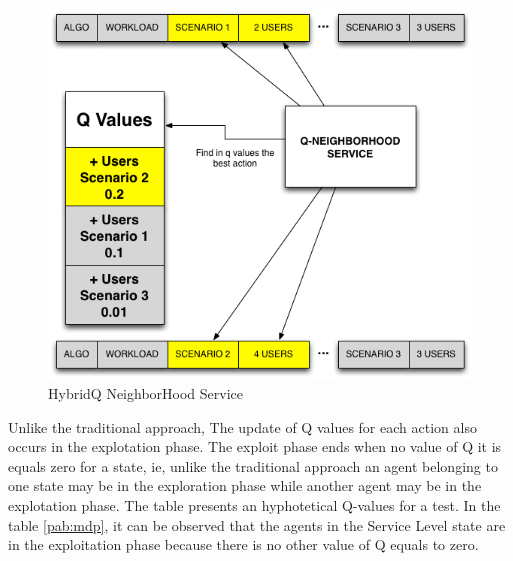 \begin{figure}[h!]
\begin{minipage}{.5\textwidth}
\includegraphics[width=1\textwidth]{./images/q-neighborservice.png}
\caption{HybridQ NeighborHood Service}
\label{fig:neighservice}
\end{minipage}
\end{figure}



Unlike the traditional approach, The update of Q values for each action also occurs in the explotation phase. The exploit phase ends when no value of Q it is equals zero for a state, ie, unlike the traditional approach an agent belonging to one state may be in the exploration phase while another agent may be in the explotation phase. The table presents an hyphotetical Q-values for a test. In the table \ref{pab:mdp}, it can be observed that the agents in the Service Level state are in the exploitation phase because there is no other value of Q equals to zero.



